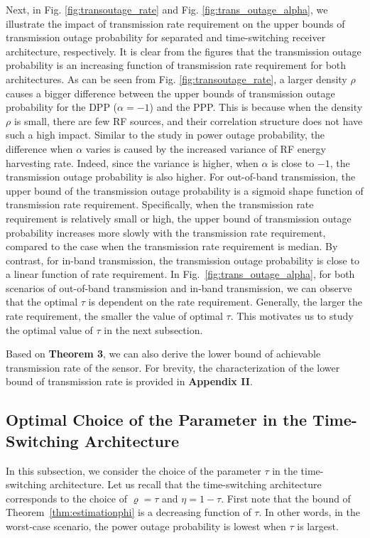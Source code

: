 \documentclass[12pt,draftclsnofoot,onecolumn]{IEEEtran}
\begin{document}
    
Next, in Fig. \ref{fig:transoutage_rate} and Fig. \ref{fig:trans_outage_alpha}, we illustrate the impact of transmission rate requirement on the upper bounds of transmission outage probability for separated and time-switching receiver architecture, respectively. It is clear from the figures that the transmission outage probability is an increasing function of transmission rate requirement for both architectures.
As can be seen from Fig. \ref{fig:transoutage_rate}, 
a larger density $\rho$ causes a bigger difference between the upper bounds of transmission outage probability for the DPP ($\alpha=-1$) and the PPP. This is because when the density $\rho$ is small, there are few RF sources, and their correlation structure does not have such a high impact.
Similar to the study in power outage probability, the difference when $\alpha$ varies is caused by the increased variance of RF energy harvesting rate. Indeed, since the variance is higher, when $\alpha$ is close to $-1$, the transmission outage probability is also higher.
For out-of-band transmission, the upper bound of the transmission outage probability is a sigmoid shape function of transmission rate requirement. Specifically, when the transmission rate requirement is relatively small or high, the upper bound of transmission outage probability increases more slowly with the transmission rate requirement, compared to the case when the transmission rate requirement is median. By contrast, for in-band transmission, the transmission outage probability is close to a linear function of rate requirement. In Fig.~\ref{fig:trans_outage_alpha}, for both scenarios of out-of-band transmission and in-band transmission, we can observe that the optimal $\tau$ is dependent on the rate requirement. Generally, the larger the rate requirement, the smaller the value of optimal $\tau$. This motivates us to study the optimal value of $\tau$ in the next subsection.  

  
Based on {\bf Theorem 3}, we can also derive the lower bound of achievable transmission rate of the sensor. For brevity, the characterization of the lower bound of transmission rate is provided in {\bf Appendix II}.  

\subsection{Optimal Choice of the Parameter in the Time-Switching Architecture}
\label{subsec:optimaltau}
 
In this subsection, we consider the choice of the parameter $\tau$ in the time-switching architecture. Let us recall that the time-switching architecture corresponds to the choice of $\varrho=\tau$ and $\eta=1-\tau$. First note that the bound of Theorem~\ref{thm:estimationphi} is a decreasing function of $\tau$. In other words, in the worst-case scenario,  the power outage probability is lowest when $\tau$ is largest.
\end{document}
